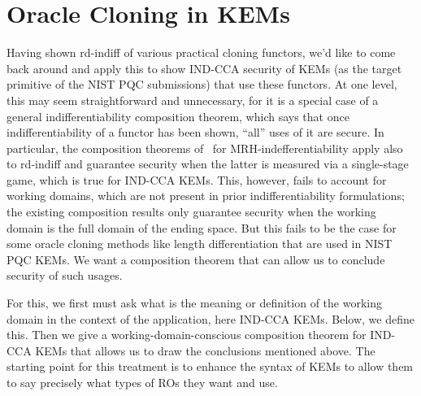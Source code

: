 
\section{Oracle Cloning in KEMs}
\label{sec-kem}

Having shown rd-indiff of various practical cloning functors, we'd like to come back around and apply this to show IND-CCA security of KEMs (as the target primitive of the NIST PQC submissions) that use these functors. At one level, this may seem straightforward and unnecessary, for it is a special case of a general indifferentiability composition theorem, which says that once indifferentiability of a functor has been shown, ``all'' uses of it are secure. In particular, the composition theorems of~\cite{TCC:MauRenHol04,EC:RisShaShr11} for MRH-indefferentiability apply also to rd-indiff and guarantee security when the latter is measured via a single-stage game, which is true for IND-CCA KEMs. This, however, fails to account for working domains, which are not present in prior indifferentiability formulations; the existing composition results only guarantee security when the working domain is the full domain of the ending space. But this fails to be the case for some oracle cloning methods like length differentiation that are used in NIST PQC KEMs. We want a composition theorem that can allow us to conclude security of such usages.

For this, we first must ask what is the meaning or definition of the working domain in the context of the application, here IND-CCA KEMs. Below, we define this. Then we give a working-domain-conscious composition theorem for IND-CCA KEMs that allows us to draw the conclusions mentioned above. The starting point for this treatment is to enhance the syntax of KEMs to allow them to say precisely what types of ROs they want and use.

%

